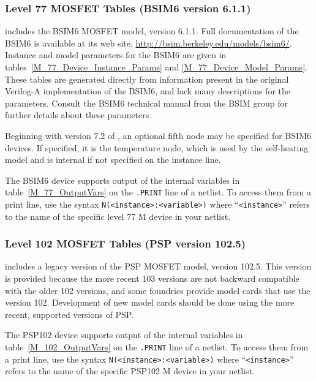 






\clearpage
\subsubsection{Level 77 MOSFET Tables (BSIM6 version 6.1.1)}
\Xyce{} includes the BSIM6 MOSFET model, version 6.1.1.  Full
documentation of the BSIM6 is available at its web site,
\url{http://bsim.berkeley.edu/models/bsim6/}.  Instance and model
parameters for the BSIM6 are given in
tables~\ref{M_77_Device_Instance_Params} and
\ref{M_77_Device_Model_Params}.  These tables are generated directly
from information present in the original Verilog-A implementation of
the BSIM6, and lack many descriptions for the parameters.  Consult the
BSIM6 technical manual from the BSIM group for further details about
these parameters.

Beginning with version 7.2 of \Xyce{}, an optional fifth node may be
specified for BSIM6 devices.  If specified, it is the temperature
node, which is used by the self-heating model and is internal if not
specified on the instance line.

The BSIM6 device supports output of the internal variables in
table~\ref{M_77_OutputVars} on the \texttt{.PRINT} line of a netlist.
To access them from a print line, use the syntax
\texttt{N(<instance>:<variable>)} where ``\texttt{<instance>}'' refers to the
name of the specific level 77 M device in your netlist.





\clearpage
\subsubsection{Level 102 MOSFET Tables (PSP version 102.5)}

\Xyce{} includes a legacy version of the PSP MOSFET model, version
102.5.  This version is provided because the more recent 103 versions
are not backward compatible with the older 102 versions, and some
foundries provide model cards that use the version 102.  Development
of new model cards should be done using the more recent, supported
versions of PSP.

The PSP102 device supports output of the internal variables in
table~\ref{M_102_OutputVars} on the \texttt{.PRINT} line of a netlist.
To access them from a print line, use the syntax
\texttt{N(<instance>:<variable>)} where ``\texttt{<instance>}'' refers to the
name of the specific PSP102 M device in your netlist.

